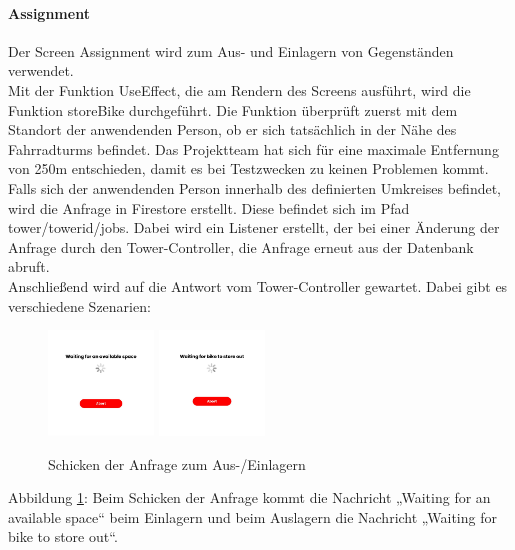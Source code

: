 \paragraph{Assignment}Der Screen Assignment wird zum Aus- und Einlagern von Gegenständen verwendet.\\
Mit der Funktion UseEffect, die am Rendern des Screens ausführt, wird die Funktion storeBike durchgeführt. Die Funktion überprüft zuerst mit dem Standort der anwendenden Person, ob er sich tatsächlich in der Nähe des Fahrradturms befindet. Das Projektteam hat sich für eine maximale Entfernung von 250m entschieden, damit es bei Testzwecken zu keinen Problemen kommt. \\
Falls sich der anwendenden Person innerhalb des definierten Umkreises befindet, wird die Anfrage in Firestore erstellt. Diese befindet sich im Pfad tower/towerid/jobs. Dabei wird ein Listener erstellt, der bei einer Änderung der Anfrage durch den Tower-Controller, die Anfrage erneut aus der Datenbank abruft.\\
Anschließend wird auf die Antwort vom Tower-Controller gewartet. Dabei gibt es verschiedene Szenarien:\\
\begin{figure}[H]
  \centering
  \includegraphics[width=0.25\textwidth]{images/app-screenshots/waitinga.png}
  \includegraphics[width=0.25\textwidth]{images/app-screenshots/waitingb.png}
  \caption{Schicken der Anfrage zum Aus-/Einlagern}
  \label{fig:screenwaiting}
\end{figure}
Abbildung \ref{fig:screenwaiting}: Beim Schicken der Anfrage kommt die Nachricht „Waiting for an available space“ beim Einlagern und beim Auslagern die Nachricht „Waiting for bike to store out“.\\
